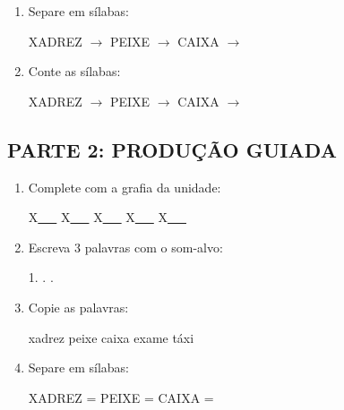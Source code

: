 \begin{exercicio}
\begin{enumerate}
  \item Separe em sílabas:
  \begin{center}
  XADREZ $\rightarrow$ \underline{\hspace{1cm}} \quad PEIXE $\rightarrow$ \underline{\hspace{1cm}} \quad CAIXA $\rightarrow$ \underline{\hspace{1cm}}
  \end{center}

  \item Conte as sílabas:
  \begin{center}
  XADREZ $\rightarrow$ \underline{\hspace{0.9cm}} \quad PEIXE $\rightarrow$ \underline{\hspace{0.9cm}} \quad CAIXA $\rightarrow$ \underline{\hspace{0.9cm}}
  \end{center}

\end{enumerate}

\subsection*{PARTE 2: PRODUÇÃO GUIADA}

\begin{enumerate}[resume]

  \item Complete com a grafia da unidade:
  \begin{center}
  X\underline{~~~} \quad X\underline{~~~} \quad X\underline{~~~} \quad X\underline{~~~} \quad X\underline{~~~}
  \end{center}

  \item Escreva 3 palavras com o som-alvo:
  \begin{center}
  1. \underline{\hspace{3cm}} . \underline{\hspace{3cm}} . \underline{\hspace{3cm}}
  \end{center}

  \item Copie as palavras:
  \begin{center}
  xadrez \quad peixe \quad caixa \quad exame \quad táxi
  \end{center}

  \item Separe em sílabas:
  \begin{center}
  XADREZ = \underline{\hspace{1cm}} \underline{\hspace{1cm}} \quad PEIXE = \underline{\hspace{1cm}} \underline{\hspace{1cm}} \quad CAIXA = \underline{\hspace{1cm}} \underline{\hspace{1cm}}
  \end{center}


\end{enumerate}
\end{exercicio}

